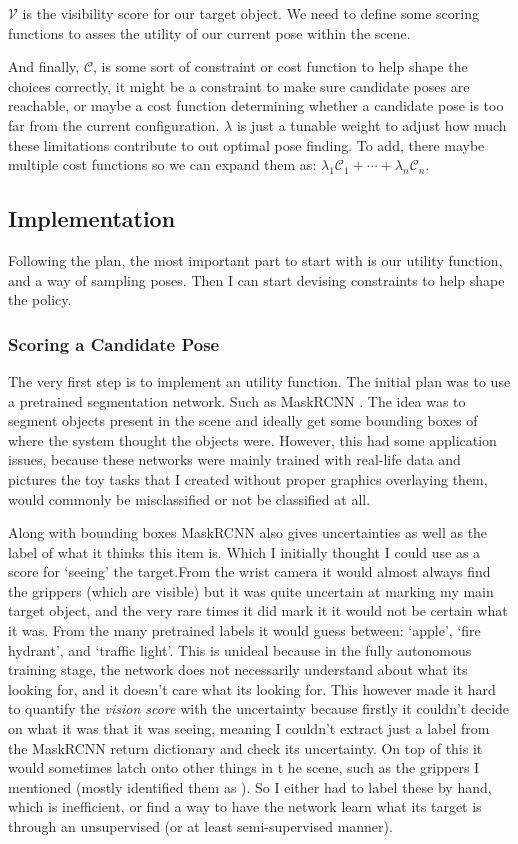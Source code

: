 $\mathcal{V}$ is the visibility score for our target object. We need to define some scoring functions to asses the utility of our current pose within the scene.

And finally, $\mathcal{C}$, is some sort of constraint or cost function to help shape the choices correctly, it might be a constraint to make sure candidate poses are reachable, or maybe a cost function determining whether a candidate pose is too far from the current configuration. $\lambda$ is just a tunable weight to adjust how much these limitations contribute to out optimal pose finding. To add, there maybe multiple cost functions so we can expand them as: \(\lambda_1\mathcal{C}_1 + \cdots +\lambda_n\mathcal{C}_n \).


\subsection{Implementation}
Following the plan, the most important part to start with is our utility function, and a way of sampling poses. Then I can start devising constraints to help shape the policy.

\subsubsection{Scoring a Candidate Pose}
The very first step is to implement an utility function. The initial plan was to use a pretrained segmentation network. Such as MaskRCNN . The idea was to segment objects present in the scene and ideally get some bounding boxes of where the system thought the objects were. However, this had some application issues, because these networks were mainly trained with real-life data and pictures the toy tasks that I created without proper graphics overlaying them, would commonly be misclassified or not be classified at all. 

Along with bounding boxes MaskRCNN also gives uncertainties as well as the label of what it thinks this item is. Which I initially thought I could use as a score for `seeing' the target.From the wrist camera it would almost always find the grippers (which are visible) but it was quite uncertain at marking my main target object, and the very rare times it did mark it it would not be certain what it was. From the many pretrained labels it would guess between: `apple', `fire hydrant', and `traffic light'. This is unideal because in the fully autonomous training stage, the network does not necessarily understand about what its looking for, and it doesn't care what its looking for. This however made it hard to quantify the \emph{vision score} with the uncertainty because firstly it couldn't decide on what it was that it was seeing, meaning I couldn't extract just a label from the MaskRCNN return dictionary and check its uncertainty. On top of this it would sometimes latch onto other things in t he scene, such as the grippers I mentioned (mostly identified them as ). So I either had to label these by hand, which is inefficient, or find a way to have the network learn what its target is through an unsupervised (or at least semi-supervised manner).

